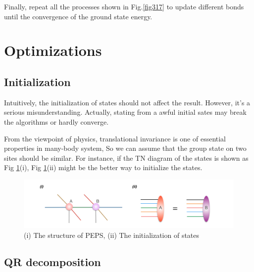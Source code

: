 	Finally, repeat all the processes shown in Fig.\ref{fig317} to update different bonds until the convergence of the ground state energy.

\section{Optimizations}
\label{2dopt}

\subsection{Initialization}
\label{2doptInit}
Intuitively, the initialization of states should not affect the result. However, it's a serious misunderstanding. Actually, stating from a awful initial sates may break the algorithms or hardly converge.

From the viewpoint of physics, translational invariance is one of essential properties in many-body system, So we can assume that the group state on two sites should be similar. For instance, if the TN diagram of the states is shown as Fig \ref{fig321}(i), Fig \ref{fig321}(ii) might be the better way to initialize the states.

\begin{figure}[ht]
	\centering
	\includegraphics[width=1.00\textwidth]{figures/fig321.png}
	\caption[The diagrams of initializing projected entangled pair states]{(i) The structure of PEPS, (ii) The initialization of states}
	\label{fig321}
\end{figure}

\subsection{QR decomposition}

